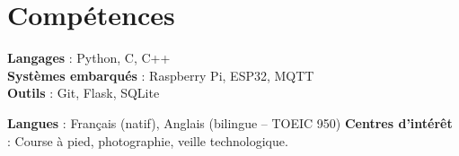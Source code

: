\documentclass[10pt,a4paper]{article}
\begin{document}
\vspace{0.1cm}
\section*{Compétences}
\textbf{Langages} : Python, C, C++ \\
\textbf{Systèmes embarqués} : Raspberry Pi, ESP32, MQTT \\
\textbf{Outils} : Git, Flask, SQLite
\vspace{0.2cm}

\noindent
\textbf{Langues} : Français (natif), Anglais (bilingue – TOEIC 950) \hfill
\textbf{Centres d’intérêt} : Course à pied, photographie, veille technologique.
\end{document}
